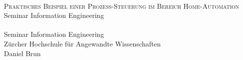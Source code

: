 




\begin{titlepage}
   \mbox{}\vspace{5\baselineskip}\\
   \rmfamily\huge
   \centering
   \textsc{Praktisches Beispiel einer Prozess-Steuerung im Bereich Home-Automation} \\[2ex]
   Seminar Information Engineering
   \rmfamily\Large
   \vspace{1\baselineskip}\\
   \vhCurrentVersion\mbox{}
   \vspace{3\baselineskip}\\
   Seminar Information Engineering\\
   Zürcher Hochschule für Angewandte Wissenschaften
   \vspace{5\baselineskip}\\
   \rmfamily\Large
   Daniel Brun
   \vspace{1\baselineskip}\\
   \vhCurrentDate
\end{titlepage}
 



% 

